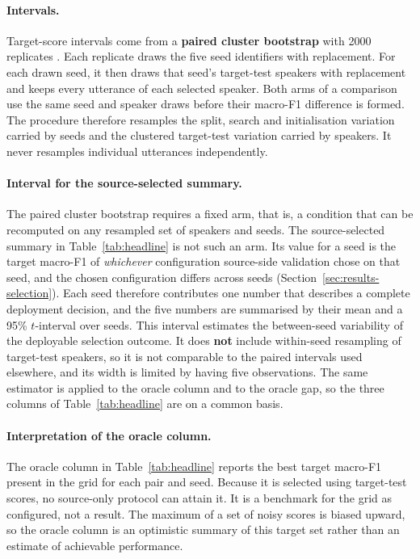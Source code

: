 \paragraph{Intervals.} Target-score intervals come from a \textbf{paired
cluster bootstrap} with 2000 replicates \cite{cameron2008cluster}. Each
replicate draws the five seed identifiers with replacement. For each drawn
seed, it then draws that seed's target-test speakers with replacement and keeps
every utterance of each selected speaker. Both arms of a comparison use the
same seed and speaker draws before their macro-F1 difference is formed. The
procedure therefore resamples the split, search and initialisation variation
carried by seeds and the clustered target-test variation carried by speakers.
It never resamples individual utterances independently.

\paragraph{Interval for the source-selected summary.} The paired cluster
bootstrap requires a fixed arm, that is, a condition that can be recomputed on
any resampled set of speakers and seeds. The source-selected summary in
Table~\ref{tab:headline} is not such an arm. Its value for a seed is the target
macro-F1 of \emph{whichever} configuration source-side validation chose on that
seed, and the chosen configuration differs across seeds
(Section~\ref{sec:results-selection}). Each seed therefore contributes one
number that describes a complete deployment decision, and the five numbers are
summarised by their mean and a 95\% $t$-interval over seeds. This interval
estimates the between-seed variability of the deployable selection outcome. It
does \textbf{not} include within-seed resampling of target-test speakers, so it
is not comparable to the paired intervals used elsewhere, and its width is
limited by having five observations. The same estimator is applied to the
oracle column and to the oracle gap, so the three columns of
Table~\ref{tab:headline} are on a common basis.

\paragraph{Interpretation of the oracle column.} The oracle column in
Table~\ref{tab:headline} reports the best target macro-F1 present in the grid
for each pair and seed. Because it is selected using target-test scores, no
source-only protocol can attain it. It is a benchmark for the grid as
configured, not a result. The maximum of a set of noisy scores is biased
upward, so the oracle column is an optimistic summary of this target set rather
than an estimate of achievable performance.

